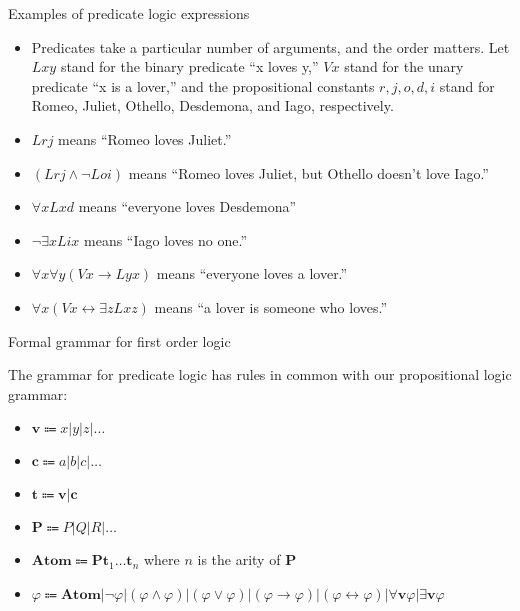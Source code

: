 \documentclass[
  ignorenonframetext,
]{beamer}
\providecommand{\tightlist}{%
  \setlength{\itemsep}{0pt}\setlength{\parskip}{0pt}}
\begin{document}
\begin{frame}{Examples of predicate logic expressions}
\protect\hypertarget{examples-of-predicate-logic-expressions}{}

\begin{itemize}[<+->]
\tightlist
\item
  Predicates take a particular number of arguments, and the order
  matters. Let \(Lxy\) stand for the binary predicate ``x loves y,''
  \(Vx\) stand for the unary predicate ``x is a lover,'' and the
  propositional constants \(r, j, o, d, i\) stand for Romeo, Juliet,
  Othello, Desdemona, and Iago, respectively.
\item
  \(Lrj\) means ``Romeo loves Juliet.''
\item
  \((Lrj \wedge {\neg}Loi)\) means ``Romeo loves Juliet, but Othello
  doesn't love Iago.''
\item
  \({\forall}x Lxd\) means ``everyone loves Desdemona''
\item
  \({\neg\exists}xLix\) means ``Iago loves no one.''
\item
  \({\forall}x {\forall}y (Vx \rightarrow Lyx)\) means ``everyone loves
  a lover.''
\item
  \({\forall}x (Vx \leftrightarrow {\exists}z Lxz)\) means ``a lover is
  someone who loves.''
\end{itemize}

\end{frame}

\begin{frame}{Formal grammar for first order logic}
\protect\hypertarget{formal-grammar-for-first-order-logic}{}

The grammar for predicate logic has rules in common with our
propositional logic grammar:

\begin{itemize}[<+->]
\tightlist
\item
  \(\textbf{v} \Coloneqq x|y|z|\ldots\)
\item
  \(\textbf{c} \Coloneqq a|b|c|\ldots\)
\item
  \(\textbf{t} \Coloneqq \textbf{v}|\textbf{c}\)
\item
  \(\textbf{P} \Coloneqq P|Q|R|\ldots\)
\item
  \(\textbf{Atom} \Coloneqq \textbf{Pt}_{1}\ldots\textbf{t}_{n}\) where
  \(n\) is the arity of \textbf{P}
\item
  \(\varphi \Coloneqq \textbf{Atom}|\neg\varphi|(\varphi \wedge \varphi)|(\varphi \vee \varphi)|(\varphi \rightarrow \varphi)|(\varphi \leftrightarrow \varphi)|{\forall}\textbf{v} \varphi|{\exists}\textbf{v} \varphi\)
\end{itemize}

\end{frame}
\end{document}
